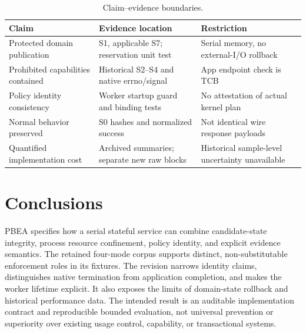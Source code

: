 \documentclass[electronics,article,submit,pdftex,moreauthors]{Definitions/mdpi}
\begin{document}
\begin{table}[H]\caption{Claim--evidence boundaries.}\label{tab:claims}
\begin{tabularx}{\textwidth}{YYY}
\toprule Claim & Evidence location & Restriction\\\midrule
Protected domain publication & S1, applicable S7; reservation unit test & Serial memory, no external-I/O rollback\\
Prohibited capabilities contained & Historical S2--S4 and native errno/signal & App endpoint check is TCB\\
Policy identity consistency & Worker startup guard and binding tests & No attestation of actual kernel plan\\
Normal behavior preserved & S0 hashes and normalized success & Not identical wire response payloads\\
Quantified implementation cost & Archived summaries; separate new raw blocks & Historical sample-level uncertainty unavailable\\\bottomrule
\end{tabularx}\end{table}

\section{Conclusions}\label{sec:conclusion}
PBEA specifies how a serial stateful service can combine candidate-state integrity, process resource confinement, policy identity, and explicit evidence semantics. The retained four-mode corpus supports distinct, non-substitutable enforcement roles in its fixtures. The revision narrows identity claims, distinguishes native termination from application completion, and makes the worker lifetime explicit. It also exposes the limits of domain-state rollback and historical performance data. The intended result is an auditable implementation contract and reproducible bounded evaluation, not universal prevention or superiority over existing usage control, capability, or transactional systems.
\end{document}
